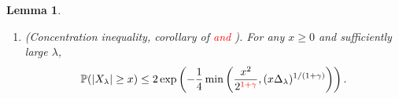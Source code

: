 \documentclass[bj,authoryear,noshowframe]{imsart}
\theoremstyle{plain}
\newtheorem{lemma}[theorem]{Lemma}
\theoremstyle{remark}
\newcommand{\IP}{\mathbb{P}}
\begin{document}
\begin{appendix}
\begin{lemma}
\begin{enumerate}
\item (Concentration inequality,
  corollary of \cite[Lemma~2.4]{saulis} \textcolor{red}{and \cite[Theorem~2.5]{doering}}).
  For any $x\ge0$ and sufficiently large $\lambda$, 
\begin{equation}
\IP(|X_\lambda|\geq x)\le2\exp\left(-\frac14\min\left( \frac{x^2}{2^{\textcolor{red}{1+\gamma}}},(x\Delta_\lambda)^{1/(1+\gamma)}\right) \right).
\end{equation} 
\end{enumerate}
\end{lemma}
\end{appendix}


\end{document}
